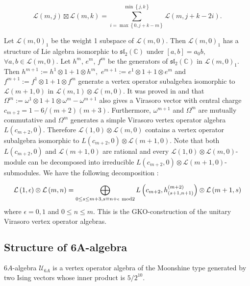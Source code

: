 \documentclass{article}
\begin{document}
	\[
	\mathcal{L}\left(m,j\right)\boxtimes\mathcal{L}\left(m,k\right)=\sum_{i=\max\left\{ 0,j+k-m\right\} }^{\min\left\{ j,k\right\} }\mathcal{L}\left(m,j+k-2i\right).
	\]
	
	Let $\mathcal{L}\left(m,0\right)_{1}$ be the weight 1 subspace of
	$\mathcal{L}(m,0)$. Then $\mathcal{L}(m,0)_{1}$ has a structure
	of Lie algebra isomorphic to $\mathfrak{sl}_{2}(\mathbb{C})$ under
	$[a,b]=a_{0}b$, $\forall a,b\in\mathcal{L}(m,0)$. Let $h^{m}$,
	$e^{m}$, $f^{m}$ be the generators of $\mathfrak{sl}_{2}(\mathbb{C})$
	in $\mathcal{L}(m,0)_{1}$. Then $h^{m+1}:=h^{1}\otimes1+1\otimes h^{m},$
	$e^{m+1}:=e^{1}\otimes1+1\otimes e^{m}$ and $f^{m+1}:=f^{1}\otimes1+1\otimes f^{m}$
	generate a vertex operator subalgebra isomorphic to $\mathcal{L}\left(m+1,0\right)$
	in $\mathcal{L}\left(m,1\right)\otimes\mathcal{L}\left(m,0\right)$.
	It was proved in \cite{DL} and \cite{KR} that $\Omega^{m}:=\omega^{1}\otimes1+1\otimes\omega^{m}-\omega^{m+1}$
	also gives a Virasoro vector with central charge $c_{m+2}=1-6/\left(m+2\right)\left(m+3\right)$.
	Furthermore, $\omega^{m+1}$ and $\Omega^{m}$ are mutually commutative
	and $\Omega^{m}$ generates a simple Virasoro vertex operator algebra
	$L\left(c_{m+2},0\right)$. Therefore $\mathcal{L}\left(1,0\right)\otimes\mathcal{L}\left(m,0\right)$
	contains a vertex operator subalgebra isomorphic to $L\left(c_{m+2},0\right)\otimes\mathcal{L}\left(m+1,0\right)$.
	Note that both $L\left(c_{m+2},0\right)$ and $\mathcal{L}\left(m+1,0\right)$
	are rational and every $\mathcal{L}\left(1,0\right)\otimes\mathcal{L}\left(m,0\right)$-module
	can be decomposed into irreducible $L(c_{m+2},0)\otimes\mathcal{L}(m+1,0)$-submodules.
	We have the following decomposition \cite{GKO}:
	
	\begin{equation}
		\mathcal{L}\left(1,\epsilon\right)\otimes\mathcal{L}\left(m,n\right)=\bigoplus_{0\le s\le m+3,s\equiv n+\epsilon\ \rm{mod} 2}L\left(c_{m+2},h_{\left(s+1,n+1\right)}^{(m+2)}\right)\otimes\mathcal{L}\left(m+1,s\right)\label{eq:(2.3)}
	\end{equation}
	where $\epsilon=0,1$ and $0\le n\le m$. This is the GKO-construction
	of the unitary Virasoro vertex operator algebras.
	
	\subsection{Structure of 6A-algebra}
	$6A$-algebra $\mathcal{U}_{6A}$ is a
	vertex operator algebra of the Moonshine type generated by two Ising
	vectors whose inner product is $5/2^{10}.$
	
\end{document}
